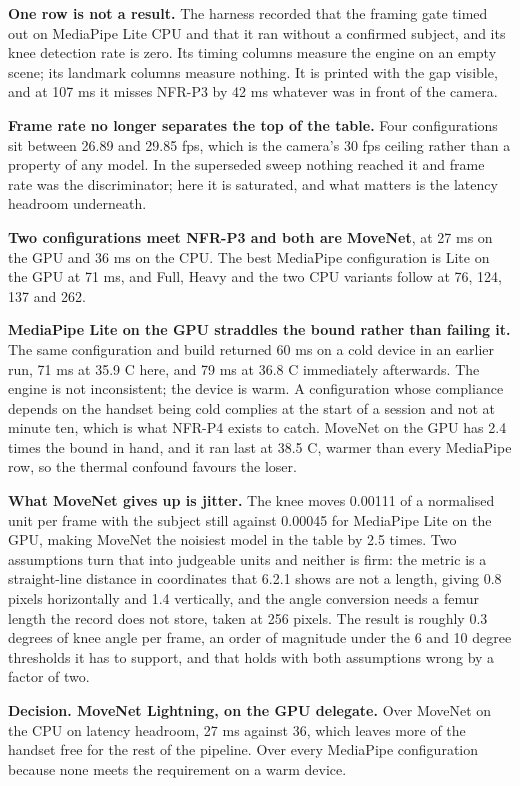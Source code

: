 \textbf{One row is not a result.} The harness recorded that the framing gate timed out on MediaPipe Lite CPU and that it ran without a confirmed subject, and its knee detection rate is zero. Its timing columns measure the engine on an empty scene; its landmark columns measure nothing. It is printed with the gap visible, and at 107 ms it misses NFR-P3 by 42 ms whatever was in front of the camera.

\textbf{Frame rate no longer separates the top of the table.} Four configurations sit between 26.89 and 29.85 fps, which is the camera's 30 fps ceiling rather than a property of any model. In the superseded sweep nothing reached it and frame rate was the discriminator; here it is saturated, and what matters is the latency headroom underneath.

\textbf{Two configurations meet NFR-P3 and both are MoveNet}, at 27 ms on the GPU and 36 ms on the CPU. The best MediaPipe configuration is Lite on the GPU at 71 ms, and Full, Heavy and the two CPU variants follow at 76, 124, 137 and 262.

\textbf{MediaPipe Lite on the GPU straddles the bound rather than failing it.} The same configuration and build returned 60 ms on a cold device in an earlier run, 71 ms at 35.9 C here, and 79 ms at 36.8 C immediately afterwards. The engine is not inconsistent; the device is warm. A configuration whose compliance depends on the handset being cold complies at the start of a session and not at minute ten, which is what NFR-P4 exists to catch. MoveNet on the GPU has 2.4 times the bound in hand, and it ran last at 38.5 C, warmer than every MediaPipe row, so the thermal confound favours the loser.

\textbf{What MoveNet gives up is jitter.} The knee moves 0.00111 of a normalised unit per frame with the subject still against 0.00045 for MediaPipe Lite on the GPU, making MoveNet the noisiest model in the table by 2.5 times. Two assumptions turn that into judgeable units and neither is firm: the metric is a straight-line distance in coordinates that 6.2.1 shows are not a length, giving 0.8 pixels horizontally and 1.4 vertically, and the angle conversion needs a femur length the record does not store, taken at 256 pixels. The result is roughly 0.3 degrees of knee angle per frame, an order of magnitude under the 6 and 10 degree thresholds it has to support, and that holds with both assumptions wrong by a factor of two.

\textbf{Decision. MoveNet Lightning, on the GPU delegate.} Over MoveNet on the CPU on latency headroom, 27 ms against 36, which leaves more of the handset free for the rest of the pipeline. Over every MediaPipe configuration because none meets the requirement on a warm device.

